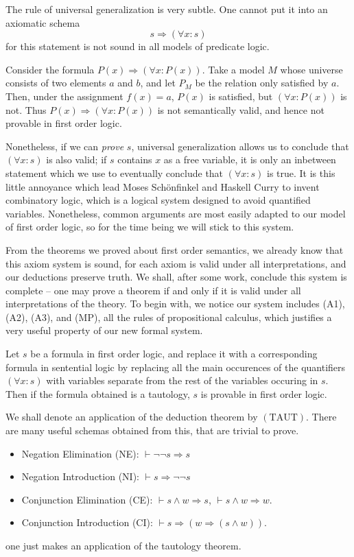 The rule of universal generalization is very subtle. One cannot put it into an axiomatic schema
%
\[ s \Rightarrow (\forall x: s) \]
%
for this statement is not sound in all models of predicate logic.

\begin{example}
    Consider the formula $P(x) \Rightarrow (\forall x: P(x))$. Take a model $M$ whose universe consists of two elements $a$ and $b$, and let $P_M$ be the relation only satisfied by $a$. Then, under the assignment $f(x) = a$, $P(x)$ is satisfied, but $(\forall x: P(x))$ is not. Thus $P(x) \Rightarrow (\forall x: P(x))$ is not semantically valid, and hence not provable in first order logic.
\end{example}

Nonetheless, if we can {\it prove} $s$, universal generalization allows us to conclude that $(\forall x: s)$ is also valid; if $s$ contains $x$ as a free variable, it is only an inbetween statement which we use to eventually conclude that $(\forall x: s)$ is true. It is this little annoyance which lead Moses Sch\"{o}nfinkel and Haskell Curry to invent combinatory logic, which is a logical system designed to avoid quantified variables. Nonetheless, common arguments are most easily adapted to our model of first order logic, so for the time being we will stick to this system.

From the theorems we proved about first order semantics, we already know that this axiom system is sound, for each axiom is valid under all interpretations, and our deductions preserve truth. We shall, after some work, conclude this system is complete -- one may prove a theorem if and only if it is valid under all interpretations of the theory. To begin with, we notice our system includes (A1), (A2), (A3), and (MP), all the rules of propositional calculus, which justifies a very useful property of our new formal system.

\begin{theorem}
    Let $s$ be a formula in first order logic, and replace it with a corresponding formula in sentential logic by replacing all the main occurences of the quantifiers $(\forall x: s)$ with variables separate from the rest of the variables occuring in $s$. Then if the formula obtained is a tautology, $s$ is provable in first order logic.
\end{theorem}

We shall denote an application of the deduction theorem by $(\text{TAUT})$. There are many useful schemas obtained from this, that are trivial to prove.
%
\begin{itemize}
    \item Negation Elimination (NE): $\vdash \neg \neg s \Rightarrow s$
    \item Negation Introduction (NI): $\vdash s \Rightarrow \neg \neg s$
    \item Conjunction Elimination (CE): $\vdash s \wedge w \Rightarrow s$, $\vdash s \wedge w \Rightarrow w$.
    \item Conjunction Introduction (CI): $\vdash s \Rightarrow (w \Rightarrow (s \wedge w))$.
\end{itemize}
%
one just makes an application of the tautology theorem.

